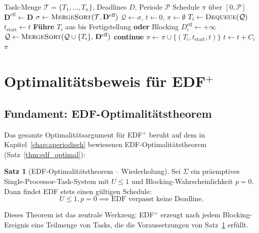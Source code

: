 ﻿\documentclass[a4paper,12pt]{report}
\theoremstyle{definition}
\newtheorem{satz}{Satz}[chapter]
\begin{document}
\begin{algorithm}[H]
	\caption{EDF$^+$ Scheduling Algorithm}
	\begin{algorithmic}[1]
		\Require Task-Menge $\mathcal{T}=\{T_1,\ldots,T_n\}$, Deadlines $D$, Periode $\mathcal{P}$
		\Ensure Schedule $\pi$ über $[0,\mathcal{P}]$
		\State $\mathbf{D}^{\text{eff}} \leftarrow \mathbf{D}$
		\State $\sigma \leftarrow \textsc{MergeSort}(\mathcal{T}, \mathbf{D}^{\text{eff}})$
		\State $\mathcal{Q} \leftarrow \sigma$, $t \leftarrow 0$, $\pi \leftarrow \emptyset$
		\State $T_i \leftarrow \textsc{Dequeue}(\mathcal{Q})$
		\State $t_{\text{start}} \leftarrow t$
		\State \textbf{Führe} $T_i$ aus bis Fertigstellung \textbf{oder} Blocking
		\State $D_i^{\text{eff}} \leftarrow +\infty$
		\State $\mathcal{Q} \leftarrow \textsc{MergeSort}(\mathcal{Q} \cup \{T_i\},\, \mathbf{D}^{\text{eff}})$
		\State \textbf{continue}
		\EndIf
		\State $\pi \leftarrow \pi \cup \{(T_i, t_{\text{start}}, t)\}$
		\State $t \leftarrow t + C_i$
		\EndWhile
		\State \Return $\pi$
	\end{algorithmic}
\end{algorithm}

\section{Optimalitätsbeweis für EDF$^+$}

\subsection{Fundament: EDF-Optimalitätstheorem}

Das gesamte Optimalitätsargument für EDF$^+$ beruht auf dem in Kapitel~\ref{chap:aperiodisch}
bewiesenen EDF-Optimalitätstheorem (Satz~\ref{thm:edf_optimal}):

\begin{satz}[EDF-Optimalitätstheorem -- Wiederholung]
	\label{satz:edf_opt_wieder}
	Sei $\Sigma$ ein präemptives Single-Processor-Task-System mit $U \leq 1$ und
	Blocking-Wahrscheinlichkeit $p = 0$. Dann findet EDF stets einen gültigen Schedule:
	\[
		U \leq 1, p = 0 \implies \text{EDF verpasst keine Deadline.}
	\]
\end{satz}

Dieses Theorem ist das zentrale Werkzeug: EDF$^+$ erzeugt nach jedem Blocking-Ereignis
eine Teilmenge von Tasks, die die Voraussetzungen von Satz~\ref{satz:edf_opt_wieder}
erfüllt.
\end{document}
